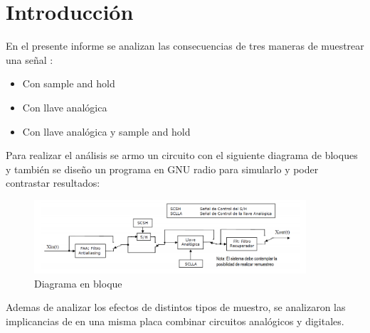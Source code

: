 \documentclass[../../ASSD_TP1_G7.tex]{subfiles}
\begin{document}
\chapter*{Introducci\'on}
En el presente informe se analizan las consecuencias de tres maneras de muestrear una se\~nal :
\begin{itemize}  
\item  Con sample and hold
\item  Con llave analógica
\item Con llave analógica y sample and hold 
\end{itemize}
Para realizar el análisis se armo un circuito con el siguiente diagrama de bloques y también se dise\~no un programa en GNU radio para simularlo y poder contrastar resultados:

\begin{figure}[H]
  \centering
   \includegraphics[width=0.9\textwidth]{figures/circuitroBloques.PNG}
  \caption{Diagrama en bloque}
  \label{fig:blocDiagram}
\end{figure}

\par Ademas de analizar los efectos de distintos tipos de muestro, se analizaron las implicancias de en una misma placa combinar circuitos analógicos y digitales.
\end{document}
